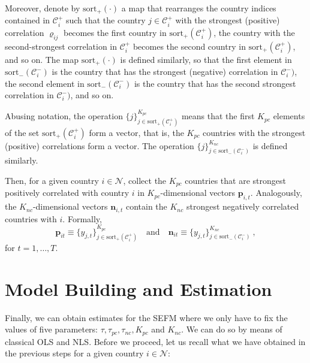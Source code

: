 \documentclass{article}
\begin{document}
Moreover, denote by $\text{sort}_{+}(\cdot)$ a map that rearranges the country indices contained in $\mathcal{C}_i^+$ such that the country $j \in \mathcal{C}_i^+$ with the strongest (positive) correlation $\varrho_{ij}$ becomes the first country in $\text{sort}_{+}(\mathcal{C}_i^+)$, the country with the second-strongest correlation in $\mathcal{C}_i^+$ becomes the second country in $\text{sort}_{+}(\mathcal{C}_i^+)$, and so on. The map $\text{sort}_{+}(\cdot)$ is defined similarly, so that the first element in $\text{sort}_{-}(\mathcal{C}_i^-)$ is the country that has the strongest (negative) correlation in $\mathcal{C}_i^-)$, the second element  in $\text{sort}_{-}(\mathcal{C}_i^-)$ is the country that has the second strongest correlation in $\mathcal{C}_i^-)$, and so on.

Abusing notation, the operation $\{ j \}_{j \in \text{sort}_{+}(\mathcal{C}^+_i)}^{K_{pc}}$ means that the first $K_{pc}$ elements of the set $\text{sort}_{+}(\mathcal{C}^+_i)$ form a vector, that is, the $K_{pc}$ countries with the strongest (positive) correlations form a vector. The operation $\{ j \}_{j \in \text{sort}_{-}(\mathcal{C}^-_i)}^{K_{nc}}$ is defined similarly.

Then, for a given country $i \in \mathcal{N}$, collect the $K_{pc}$ countries that are strongest positively correlated with country $i$ in $K_{pc}$-dimensional vectors $\mathbf{p}_{i,t}$. Analogously, the $K_{nc}$-dimensional vectors $\mathbf{n}_{i,t}$ contain the $K_{nc}$ strongest negatively correlated countries with $i$. Formally,
\begin{equation}
    \mathbf{p}_{it} \equiv \big\{ y_{j,t} \big\}_{j \in \text{sort}_{+}(\mathcal{C}_i^+)}^{K_{pc}}
    \quad 
    \text{and}
    \quad
    \mathbf{n}_{it} \equiv \big\{ y_{j,t} \big\}_{j \in \text{sort}_{-}(\mathcal{C}_i^-)}^{K_{nc}}\ , 
\end{equation}
for $t=1,\dots,T$.

\section{Model Building and Estimation}
Finally, we can obtain estimates for the SEFM where we only have to fix the values of five parameters: $\tau, \tau_{pc}, \tau_{nc}, K_{pc}$ and $K_{nc}$. We can do so by means of classical OLS and NLS. Before we proceed, let us recall what we have obtained in the previous steps for a given country $i \in \mathcal{N}$:
\end{document}
